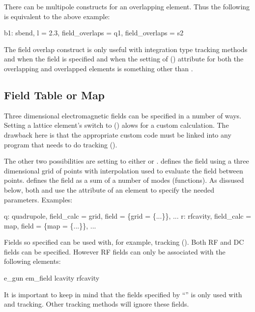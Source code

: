 There can be multipole  constructs for an overlapping element.
Thus the following is equivalent to the above example:
\begin{example}
  b1: sbend, l = 2.3, field_overlaps = q1, field_overlaps = s2
\end{example}

The field overlap construct is only useful with integration type tracking methods and when the
field is specified and when the setting of  () attribute for
both the overlapping and overlapped elements is something other than .

\subsection{Field Table or Map}
\label{s:field.tab.map}

Three dimensional electromagnetic fields can be specified in a number
of ways. Setting a lattice element's  switch to
 () alows for a custom calculation. The
drawback here is that the appropriate custom code must be linked into
any program that needs to do tracking ().

The other two possibilities are setting  to either
 or .  defines the field using a three
dimensional grid of points with interpolation used to evaluate the
field between points.  defines the field as a sum of a number of
modes (functions). As dissused below, both  and  use the 
 attribute of an element to specify the needed parameters.
Examples:
\begin{example}
  q: quadrupole, field_calc = grid, field = \{grid = \{...\}\}, ...
  r: rfcavity, field_calc = map, field = \{map = \{...\}\}, ...
\end{example}
Fields so specified can be used with, for example, 
tracking (). Both RF and DC fields can be specified.
However RF fields can only be associated with the following elements:
\begin{example}
  e_gun
  em_field
  lcavity
  rfcavity
\end{example}

It is important to keep in mind that the fields specified by ``'' is only used with  and 
tracking. Other tracking methods will ignore these fields.


